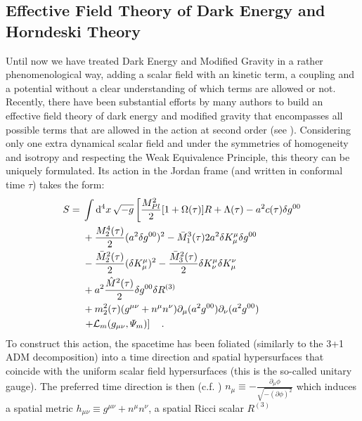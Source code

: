 \subsection{Effective Field Theory of Dark Energy and Horndeski Theory \label{sub:EFT-of-DE}}

Until now we have treated Dark Energy and Modified Gravity in a rather phenomenological way,
adding a scalar field with an kinetic term, a coupling and a potential without a clear understanding
of which terms are allowed or not.
Recently, there have been substantial efforts by many authors to build an effective field theory 
of dark energy and modified gravity that encompasses all possible terms that are allowed 
in the action at second order (see \cite{Gubitosi2013, gleyzes, bloomfield}). Considering only one extra dynamical
scalar field and under the symmetries of homogeneity and isotropy and respecting the Weak Equivalence Principle,
this theory can be uniquely formulated. Its action in the Jordan frame (and written in conformal time $\tau$) takes the form:
\begin{align}\label{eq:EFT-action}
\begin{split}
S ={}& \int \mathrm{d}^{4} {x} \, \sqrt{-g} \left[ \frac{M_{Pl}^2}{2} [1 + \Omega(\tau)] R + \Lambda(\tau) -a^2 c(\tau)\delta g^{00} \right. \\
     & + \frac{M_{2}^4 (\tau)}{2}(a^2 \delta g^{00})^2 -\bar{M}_{1}^3 (\tau) 2 a^2 \delta K^\mu_\mu \delta g^{00} \\
     & - \frac{\bar{M}_2^2 (\tau)}{2} (\delta K_\mu^\mu )^2 - \frac{\bar{M}_3^2 (\tau)}{2}\delta K^{\mu}_{\nu}\delta K^{\nu}_{\mu} \\
     & + a^2 \frac{\hat{M}^2 (\tau)}{2} \delta g^{00} \delta R^{(3)} \\
     & + m^2_2(\tau) (g^{\mu \nu} + n^\mu n^\nu) \partial_{\mu} (a^2 g^{00})\partial_{\nu} (a^2 g^{00}) \\
     & \left. + \mathcal{L}_m(g_{\mu \nu}, \varPsi_m) \right] \quad.
\end{split}
\end{align}
To construct this action, the spacetime has been foliated (similarly to the 3+1 ADM decomposition) into a time direction
and spatial hypersurfaces that coincide with the uniform scalar field hypersurfaces (this is the so-called unitary gauge). 
The preferred time direction is then (c.f. \cite{gubitosi})
\beeqc$
n_\mu \equiv -\frac{\partial_{\mu}\phi}{\sqrt{-(\partial \phi)^2}}
$
which induces a spatial metric $h_{\mu \nu} \equiv g^{\mu \nu} + n^\mu n^\nu $, a spatial Ricci scalar $R^{(3)}$

